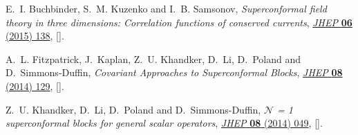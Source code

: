 \begin{thebibliography}{10}
E.~I. Buchbinder, S.~M. Kuzenko and I.~B. Samsonov, \emph{{Superconformal field
  theory in three dimensions: Correlation functions of conserved currents}},
  \href{http://dx.doi.org/10.1007/JHEP06(2015)138}{\emph{JHEP} {\bfseries 06}
  (2015) 138}, [\href{https://arxiv.org/abs/1503.04961}{{}}].

A.~L. Fitzpatrick, J.~Kaplan, Z.~U. Khandker, D.~Li, D.~Poland and
  D.~Simmons-Duffin, \emph{{Covariant Approaches to Superconformal Blocks}},
  \href{http://dx.doi.org/10.1007/JHEP08(2014)129}{\emph{JHEP} {\bfseries 08}
  (2014) 129}, [\href{https://arxiv.org/abs/1402.1167}{{}}].

Z.~U. Khandker, D.~Li, D.~Poland and D.~Simmons-Duffin, \emph{{$\mathcal{N}$ =
  1 superconformal blocks for general scalar operators}},
  \href{http://dx.doi.org/10.1007/JHEP08(2014)049}{\emph{JHEP} {\bfseries 08}
  (2014) 049}, [\href{https://arxiv.org/abs/1404.5300}{{}}].

\end{thebibliography}\endgroup
